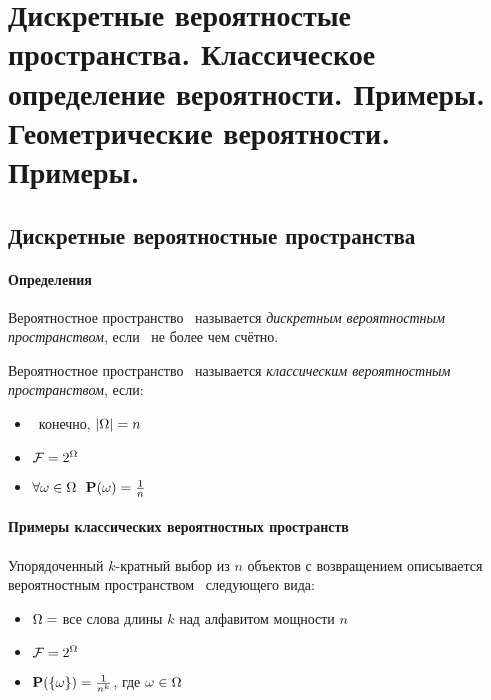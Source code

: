 \section{Дискретные вероятностые пространства. Классическое определение вероятности. Примеры. Геометрические вероятности. Примеры.}

\subsection{Дискретные вероятностные пространства}

\paragraph{Определения}

\begin{definition}
Вероятностное пространство \PSP~называется {\it дискретным вероятностным пространством}, если \oO~не более чем счётно.
\end{definition}

\begin{definition}
Вероятностное пространство \PSP~называется {\it классическим вероятностным пространством}, если:
	\begin{itemize}
	\item \oO~конечно, $|\Omega| = n $
	\item $\mathcal{F} = 2^{\Omega}$
	\item $\forall \omega \in \Omega~~\mathbf{P}(\omega) = \frac{1}{n}$
	\end{itemize}
\end{definition}


\paragraph{Примеры классических вероятностных пространств}


\begin{example}
Упорядоченный $k$-кратный выбор из $n$ объектов с возвращением описывается вероятностным пространством \PSP~следующего вида:
\begin{itemize}
		\item $\Omega = $ все слова длины $k$ над алфавитом мощности $n$
		\item $\mathcal{F} = 2^{\Omega}$
		\item $\mathbf{P}(\{\omega\}) = \frac{1}{n^k}$, где $\omega \in \Omega$
	\end{itemize}
\end{example}

